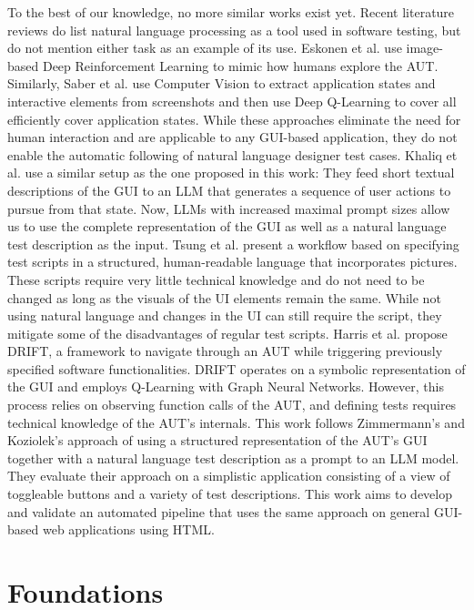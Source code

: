 To the best of our knowledge, no more similar works exist yet.
Recent literature reviews do list natural language processing as a tool used in software testing, but do not mention either task as an example of its use. \cite{implementation_verma_2023, machine_fontes_2021}
Eskonen et al. use image-based Deep Reinforcement Learning to mimic how humans explore the AUT. \cite{deep_reinforcement_exploring}
Similarly, Saber et al. use Computer Vision to extract application states and interactive elements from screenshots and then use Deep Q-Learning to cover all efficiently cover application states. While these approaches eliminate the need for human interaction and are applicable to any GUI-based application, they do not enable the automatic following of natural language designer test cases. \cite{saber_testing}
Khaliq et al. use a similar setup as the one proposed in this work: They feed short textual descriptions of the GUI to an LLM that generates a sequence of user actions to pursue from that state. \cite{transformers_exploratory}
Now, LLMs with increased maximal prompt sizes allow us to use the complete representation of the GUI as well as a natural language test description as the input.
Tsung et al. present a workflow based on specifying test scripts in a structured, human-readable language that incorporates pictures. \cite{tsung}
These scripts require very little technical knowledge and do not need to be changed as long as the visuals of the UI elements remain the same.
While not using natural language and changes in the UI can still require the script, they mitigate some of the disadvantages of regular test scripts.
Harris et al. propose DRIFT, a framework to navigate through an AUT while triggering previously specified software functionalities.\cite{harries2020drift}
DRIFT operates on a symbolic representation of the GUI and employs Q-Learning with Graph Neural Networks. However, this process relies on observing function calls of the AUT, and defining tests requires technical knowledge of the AUT's internals.
This work follows Zimmermann’s and Koziolek’s approach \cite{GPT3Testing} of using a structured representation of the AUT’s GUI together with a natural language test description as a prompt to an LLM model. They evaluate their approach on a simplistic application consisting of a view of toggleable buttons and a variety of test descriptions. This work aims  to develop and validate an automated pipeline that uses the same approach on general GUI-based web applications using HTML.

\chapter{Foundations}
\label{ch:SecondContent}

